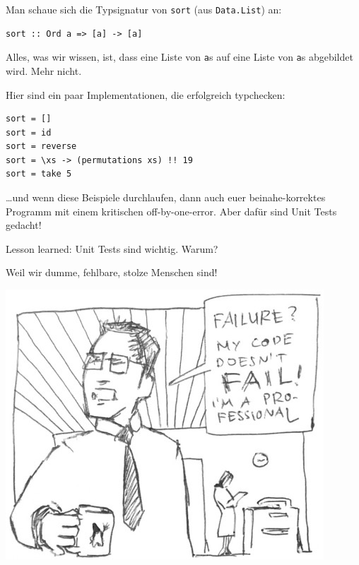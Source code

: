 \documentclass{beamer}
\begin{document}
\begin{frame}[fragile]

Man schaue sich die Typsignatur von \texttt{sort} (aus \texttt{Data.List}) an:

\begin{verbatim}
sort :: Ord a => [a] -> [a]
\end{verbatim}

Alles, was wir wissen, ist, dass eine Liste von \texttt{a}s auf eine Liste von \texttt{a}s abgebildet wird. Mehr nicht.
\pause
\smallskip

Hier sind ein paar Implementationen, die erfolgreich typchecken:

\begin{verbatim}
sort = []
sort = id
sort = reverse
sort = \xs -> (permutations xs) !! 19
sort = take 5
\end{verbatim}
\pause

\dots und wenn diese Beispiele durchlaufen, dann auch euer beinahe-korrektes Programm mit einem kritischen off-by-one-error. Aber dafür sind Unit Tests gedacht!
\end{frame}


\begin{frame}
Lesson learned: Unit Tests sind wichtig. Warum?\pause

Weil wir dumme, fehlbare, stolze Menschen sind!

\begin{center}
\includegraphics[scale=0.45]{unit_tests.jpg} 
\end{center}

\end{frame}
\end{document}

